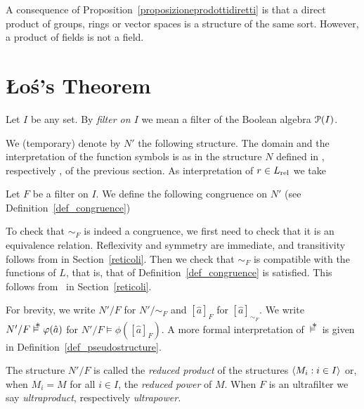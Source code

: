 A consequence of Proposition~\ref{proposizioneprodottidiretti} is that a direct product of groups, rings or vector spaces is a structure of the same sort.
However, a product of fields is not a field.

\section{\L o\'{s}'s Theorem}
Let $I$ be any set.
By \emph{filter on $I$\/} we mean a filter of the Boolean algebra $\P(I)$.

We (temporary) denote by $N'$ the following structure.
The domain and the interpretation of the function symbols is as in the structure $N$ defined in , respectively , of the previous section.
As interpretation of $r\in L_{\rm rel}$ we take


Let $F$ be a filter on $I$.
We define the following congruence on $N'$ (see Definition~\ref{def_congruence})


To check that $\sim_F$ is indeed a congruence, we first need to check that it is an equivalence relation.
Reflexivity and symmetry are immediate, and transitivity follows from  in Section~\ref{reticoli}.
Then we check that $\sim_F$ is compatible with the functions of $L$, that is, that  of Definition~\ref{def_congruence} is satisfied.
This follows from~ in Section~\ref{reticoli}.

For brevity, we write $N'/F$ for $N'/{\sim}_F$ and $[\hat a]_F$ for $[\hat a]_{\sim_F}$.
We write $N'/F\pmodels\phi(\hat a)$ for $N'/F\models\phi([\hat a]_F)$.
A more formal interpretation of $\,\pmodels\,$ is given in Definition~\ref{def_pseudostructure}.

The structure $N'/F$ is called the \emph{reduced product\/} of the structures $\<M_i:i\in I\>$ or, when $M_i=M$ for all $i\in I$, the \emph{reduced power\/} of $M$.
When $F$ is an ultrafilter we say \emph{ultraproduct}, respectively \emph{ultrapower.}

